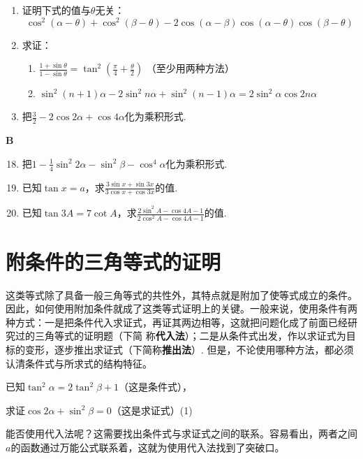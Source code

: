 \begin{enumerate}
\item 证明下式的值与$\theta$无关：
\[\cos^2(\alpha-\theta)+\cos^2(\beta-\theta)-2\cos(\alpha-\beta)\cos(\alpha-\theta)\cos(\beta-\theta)\]
\item 求证：
\begin{enumerate}[(1)]
    \item $\frac{1+\sin\theta}{1-\sin\theta}=\tan^2\left(\frac{\pi}{4}+\frac{\theta}{2}\right)$ （至少用两种方法）
    \item $\sin^2 (n+1)\alpha-2\sin^2 n\alpha+\sin^2 (n-1)\alpha=2\sin^2\alpha\cos2n \alpha$
\end{enumerate}
\item 把$\frac{3}{2}-2\cos2\alpha+\cos4\alpha$化为乘积形式.
\end{enumerate}

\begin{center}
    \bfseries B
\end{center}

\begin{enumerate}\setcounter{enumi}{17}
    \item 把$1-\frac{1}{4}\sin^2 2\alpha-\sin^2\beta-\cos^4\alpha$化为乘积形式.
    \item 已知$\tan x=a$，求$\frac{3\sin x+\sin 3x}{3\cos x+\cos 3x}$的值.
    \item 已知$\tan 3A=7\cot A$，求$\frac{2\sin^2 A-\cos 4A-1}{2\cos^2 A-\cos 4A-1}$的值.
\end{enumerate}

\section{附条件的三角等式的证明}
这类等式除了具备一般三角等式的共性外，其特点就是附加了使等式成立的条件。因此，如何使用附加条件就成了这类等式证明上的关键。一般来说，使用条件有两种方式：一是把条件代入求证式，再证其两边相等，这就把问题化成了前面已经研究过的三角等式的证明题（下简 称\textbf{代入法}）；二是从条件式出发，作以求证式为目标的变形，逐步推出求证式（下简称\textbf{推出法}）. 但是，不论使用哪种方法，都必须认清条件式与所求式的结构特征。

\begin{example}
已知$\tan^2\alpha=2\tan^2\beta+1$（这是条件式），

求证$\cos2\alpha+\sin^2\beta=0$（这是求证式）\hfill (1)
\end{example}

\begin{analyze}
    能否使用代入法呢？这需要找出条件式与求证式之间的联系。容易看出，两者之间$a$的函数通过万能公式联系着，这就为使用代入法找到了突破口。
\end{analyze}

